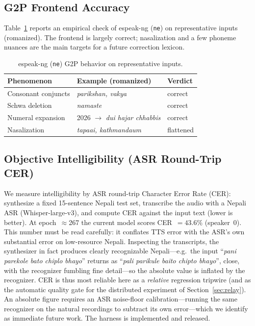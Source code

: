 \documentclass[conference]{IEEEtran}
\begin{document}
\subsection{G2P Frontend Accuracy}
\label{sec:g2p}
Table~\ref{tab:g2p} reports an empirical check of espeak-ng (\texttt{ne}) on representative inputs (romanized).
The frontend is largely correct; nasalization and a few phoneme nuances are the main targets for a future
correction lexicon.

\begin{table}[t]
\caption{espeak-ng (\texttt{ne}) G2P behavior on representative inputs.}
\label{tab:g2p}
\centering
\begin{tabular}{@{}lll@{}}
\toprule
Phenomenon & Example (romanized) & Verdict \\
\midrule
Consonant conjuncts & \emph{parikshan, vakya} & correct \\
Schwa deletion & \emph{namaste} & correct \\
Numeral expansion & 2026 $\rightarrow$ \emph{dui hajar chhabbis} & correct \\
Nasalization & \emph{tapaai, kathmandaum} & flattened \\
\bottomrule
\end{tabular}
\end{table}

\subsection{Objective Intelligibility (ASR Round-Trip CER)}
We measure intelligibility by ASR round-trip Character Error Rate (CER): synthesize a fixed 15-sentence Nepali
test set, transcribe the audio with a Nepali ASR (Whisper-large-v3), and compute CER against the input text
(lower is better). At epoch~$\approx$267 the current model scores CER~$=43.6\%$ (speaker~0). This number must
be read carefully: it conflates TTS error with the ASR's own substantial error on low-resource Nepali.
Inspecting the transcripts, the synthesizer in fact produces clearly recognizable Nepali---e.g.\ the input
``\textit{pani parekole bato chiplo bhayo}'' returns as ``\textit{pali parikule baito chipto bhayo}'', close,
with the recognizer fumbling fine detail---so the absolute value is inflated by the recognizer. CER is thus
most reliable here as a \emph{relative} regression tripwire (and as the automatic quality gate for the
distributed experiment of Section~\ref{sec:relay}). An absolute figure requires an ASR noise-floor
calibration---running the same recognizer on the natural recordings to subtract its own error---which we
identify as immediate future work. The harness is implemented and released.
\end{document}
